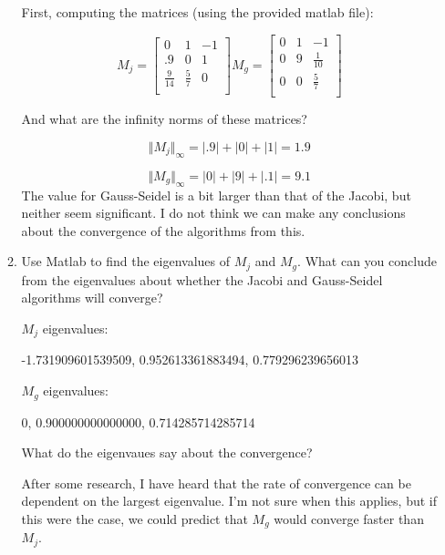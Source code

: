 \documentclass{article}
\begin{document}
\begin{enumerate}
\begin{enumerate}
\begin{mdframed}[style=MyFrame]
First, computing the matrices (using the provided matlab file):

\begin{equation*}
  M_{j} = \begin{bmatrix}
     0     &1     &-1 \\
     .9     &0     &1 \\
     \frac{9}{14}     &\frac{5}{7}     &0 \\
  \end{bmatrix}
M_{g} = \begin{bmatrix}
 0     &1     &-1 \\
 0     &9     &\frac{1}{10} \\
0       &0     &\frac{5}{7} \\
\end{bmatrix}
\end{equation*}

And what are the infinity norms of these matrices?

\begin{equation*}
\Vert M_{j} \Vert_{\infty} = |.9| + |0| + |1| = 1.9
\end{equation*}

\begin{equation*}
\Vert M_{g} \Vert_{\infty} = |0| + |9| + |.1| = 9.1
\end{equation*}
The value for Gauss-Seidel is a bit larger than that of the Jacobi, but neither seem significant. I do not think we can make any conclusions about the convergence of the algorithms from this.
\end{mdframed}

\item Use Matlab to find the eigenvalues of $M_j$ and $M_g$. What can you conclude from the eigenvalues about whether the Jacobi and Gauss-Seidel algorithms will converge? \newline

\begin{mdframed}[style=MyFrame]

$M_j$ eigenvalues:

  -1.731909601539509,
   0.952613361883494,
   0.779296239656013

$M_g$ eigenvalues:

                   0,
   0.900000000000000,
   0.714285714285714

What do the eigenvaues say about the convergence?

After some research, I have heard that the rate of convergence can be dependent on the largest eigenvalue. I'm not sure when this applies, but if this were the case, we could predict that $M_g$ would converge faster than $M_j$.


\end{mdframed}
\end{enumerate}
\end{enumerate}
\end{document}
